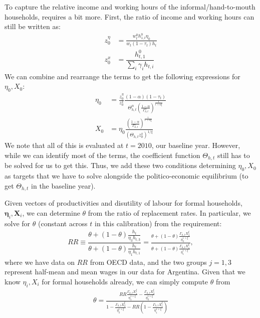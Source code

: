 \documentclass[a4paper]{article}
\begin{document}
To capture the relative income and working hours of the informal/hand-to-mouth households, requires a bit more. First, the ratio of income and working hours can still be written as:
\begin{align*}
    z_0^{\eta} &= \frac{w_t^0h_{1,t}^0\eta_{0}}{w_t(1-\tau_t)h_t} \\
    z_0^x &= \dfrac{h_{t,1}^0}{\sum_i \gamma_{i} h_{t,i}}
\end{align*}
We can combine and rearrange the terms to get the following expressions for $\eta_0, X_0$:
\begin{align}
    \eta_{0} &= \frac{z_0^{\eta}}{z_0^x}\frac{(1-\alpha)(1-\tau_t)}{\Theta_{h,t}^{\alpha}\left(\frac{1-\alpha}{\Gamma_{h,t}^{\alpha}}\right)^{\frac{1}{1+\alpha\xi}}} \label{\refeq:calibration:eta0}\\
    X_{0} &= \eta_{0}\frac{\left(\frac{1-\alpha}{\Gamma_{h,t}^{\alpha}}\right)^{\frac{1}{1+\alpha\xi}}}{\left(\Theta_{h,t}z_0^x\right)^{1/\xi}} \label{\refeq:calibration:X0}
\end{align}
We note that all of this is evaluated at $t=2010$, our baseline year. However, while we can identify most of the terms, the coefficient function $\Theta_{h,t}$ still has to be solved for us to get this. Thus, we add these two conditions determining $\eta_0, X_0$ as targets that we have to solve alongside the politico-economic equilibrium (to get $\Theta_{h,t}$ in the baseline year). 



Given vectors of productivities and disutility of labour for formal households, $\bm{\eta}_i, \bm{X}_i$, we can determine $\theta$ from the ratio of replacement rates. In particular, we solve for $\theta$ (constant across $t$ in this calibration) from the requirement:
 \begin{align*}
        RR \equiv \dfrac{\theta+(1-\theta)\frac{h_t}{\eta_3 h_{t,3}}}{\theta+(1-\theta)\frac{h_t}{\eta_1 h_{t,1}}} = \frac{\theta + (1-\theta)\frac{\Gamma_{h,t} X_3^{\xi}}{\eta_3^{1+\xi}}}{\theta+(1-\theta)\frac{\Gamma_{h,t} X_1^{\xi}}{\eta_1^{1+\xi}}},
\end{align*}
where we have data on $RR$ from OECD data, and the two groups $j=1, 3$ represent half-mean and mean wages in our data for Argentina. Given that we know $\eta_i, X_i$ for formal households already, we can simply compute $\theta$ from
\begin{align}
    \theta = \frac{RR \frac{\Gamma_{h,t} X_1^{\xi}}{\eta_1^{1+\xi}} - \frac{\Gamma_{h,t} X_3^{\xi}}{\eta_3^{1+\xi}}}{1-\frac{\Gamma_{h,t} X_3^{\xi}}{\eta_3^{1+\xi}}-RR\left(1-\frac{\Gamma_{h,t} X_1^{\xi}}{\eta_1^{1+\xi}}\right)}
\end{align}
\end{document}

